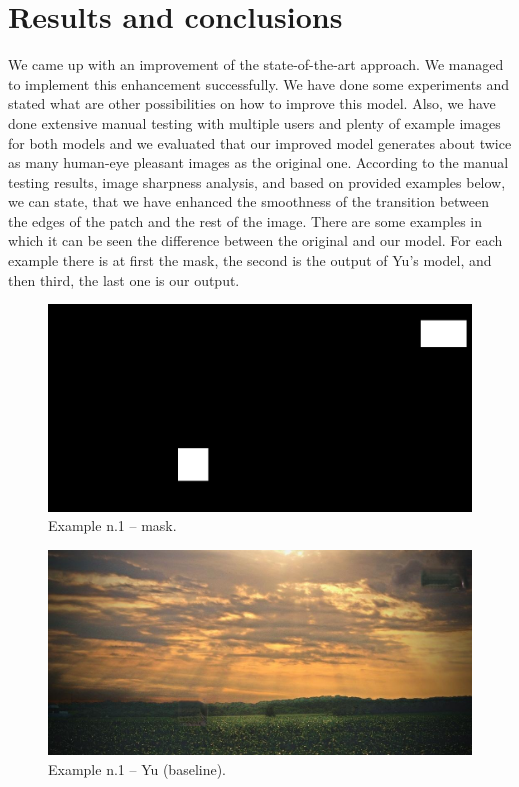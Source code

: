 \documentclass[a4paper, 11pt]{article}
\begin{document}
\section{Results and conclusions}
\label{section:results}
We came up with an improvement of the state-of-the-art approach. We managed to implement this enhancement successfully.
We have done some experiments and stated what are other possibilities on how to improve this model.
Also, we have done extensive manual testing with multiple users and plenty of example images for both models and we evaluated that our improved model generates about twice as many human-eye pleasant images as the original one.
According to the manual testing results, image sharpness analysis, and based on provided examples below, we can state, that we have enhanced the smoothness of the transition between the edges of the patch and the rest of the image.
There are some examples in which it can be seen the difference between the original and our model.
For each example there is at first the mask, the second is the output of Yu's model, and then third, the last one is our output.
\begin{figure}
    \centering
    \includegraphics[width=.95\linewidth]{documentation/img/masks/0001_mask.png}
    \caption{Example n.1 -- mask.}
    \label{img:ex_n.1_mask}
\end{figure}
\begin{figure}
    \centering
    \includegraphics[width=.95\linewidth]{documentation/img/baseline/0001.png}
    \caption{Example n.1 -- Yu (baseline).}
    \label{img:ex_n.1_mask}
\end{figure}
\end{document}
